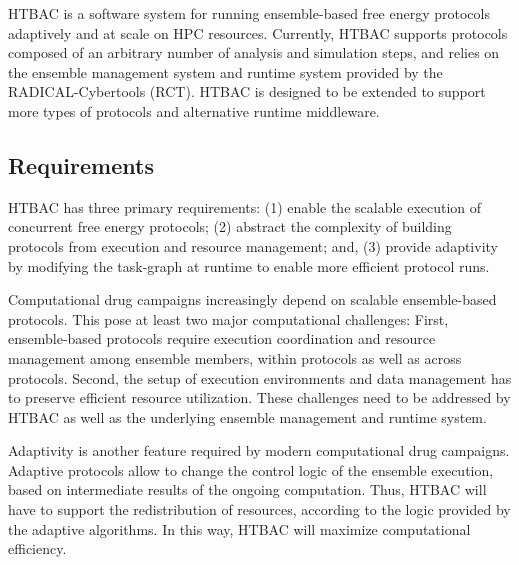 HTBAC is a software system for running ensemble-based free energy protocols
adaptively and at scale on HPC resources. Currently, HTBAC supports protocols
composed of an arbitrary number of analysis and simulation steps, and relies
on the ensemble management system and runtime system provided by the
RADICAL-Cybertools (RCT). HTBAC is designed to be extended to support more
types of protocols and alternative runtime middleware.





\subsection{Requirements}

HTBAC has three primary requirements: (1) enable the scalable execution of
concurrent free energy protocols; (2) abstract the complexity of building
protocols from execution and resource management; and, (3) provide adaptivity
by modifying the task-graph at runtime to enable more efficient protocol
runs.

Computational drug campaigns increasingly depend on scalable ensemble-based
protocols. This pose at least two major computational challenges: First,
ensemble-based protocols require execution coordination and resource
management among ensemble members, within protocols as well as across
protocols. Second, the setup of execution environments and data management
has to preserve efficient resource utilization. These challenges need to be
addressed by HTBAC as well as the underlying ensemble management and runtime
system.

Adaptivity is another feature required by modern computational drug
campaigns. Adaptive protocols allow to change the control logic of the
ensemble execution, based on intermediate results of the ongoing computation.
Thus, HTBAC will have to support the redistribution of resources, according
to the logic provided by the adaptive algorithms. In this way, HTBAC will
maximize computational efficiency.

